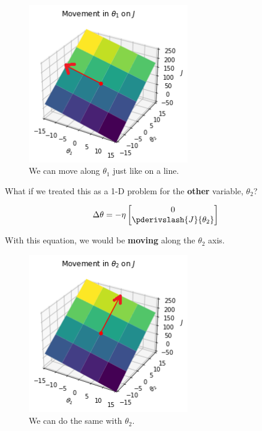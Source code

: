         \begin{figure}[H]
            \centering
                \includegraphics[width=70mm,scale=0.5]{images/gradient_descent_images/theta1_movement_plane.png}
            \caption*{We can move along $\theta_1$ just like on a line.}
        \end{figure}
        
        What if we treated this as a 1-D problem for the \textbf{other} variable, $\theta_2$?
        
        \begin{equation}
            \Delta \theta
            =
            - \eta 
            \begin{bmatrix}
                  0 \\ \pderivslash{J}{\theta_2} 
            \end{bmatrix}
        \end{equation}
        
        With this equation, we would be \textbf{moving} along the $\theta_2$ axis.
        
        \begin{figure}[H]
            \centering
                \includegraphics[width=70mm,scale=0.5]{images/gradient_descent_images/theta2_movement_plane.png}
            \caption*{We can do the same with $\theta_2$.}
        \end{figure}
        
